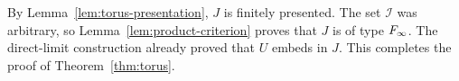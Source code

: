 By Lemma~\ref{lem:torus-presentation}, $J$ is finitely presented.
The set $\mathcal I$ was arbitrary, so
Lemma~\ref{lem:product-criterion} proves that $J$ is of type
$F_\infty$.  The direct-limit construction already proved that
$U$ embeds in $J$.  This completes the proof of
Theorem~\ref{thm:torus}.
